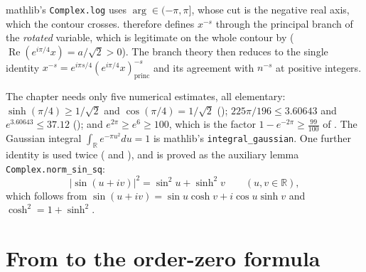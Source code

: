 \begin{remark}
\label{rem:rs_branch}
mathlib's \texttt{Complex.log} uses $\arg\in(-\pi,\pi]$, whose cut is the negative real
axis, which the contour crosses.   therefore defines $x^{-s}$
through the principal branch of the \emph{rotated} variable, which is legitimate on the
whole contour by  ($\operatorname{Re}(e^{i\pi/4}x)=a/\sqrt2>0$).
The branch theory then reduces to the single identity
$x^{-s}=e^{i\pi s/4}(e^{i\pi/4}x)^{-s}_{\mathrm{princ}}$ and its agreement with $n^{-s}$
at positive integers.
\end{remark}

\begin{remark}
\label{rem:rs_numerics}
The chapter needs only five numerical estimates, all elementary:
$\sinh(\pi/4)\ge1/\sqrt2$ and $\cos(\pi/4)=1/\sqrt2$ ();
$225\pi/196\le3.60643$ and $e^{3.60643}\le37.12$ ();
and $e^{2\pi}\ge e^{6}\ge100$, which is the factor $1-e^{-2\pi}\ge\tfrac{99}{100}$ of
.  The
Gaussian integral $\int_{\mathbb{R}}e^{-\pi u^{2}}du=1$ is mathlib's
\texttt{integral\_gaussian}.  One further identity is used twice
( and ), and is proved as the auxiliary lemma
\texttt{Complex.norm\_sin\_sq}:
\[
  \lvert\sin(u+iv)\rvert^{2}=\sin^{2}u+\sinh^{2}v\qquad(u,v\in\mathbb{R}),
\]
which follows from $\sin(u+iv)=\sin u\cosh v+i\cos u\sinh v$ and
$\cosh^{2}=1+\sinh^{2}$.
\end{remark}

\section{From \texorpdfstring{}{the remainder bound} to the order-zero formula}
\label{sec:rs_roadmap}

